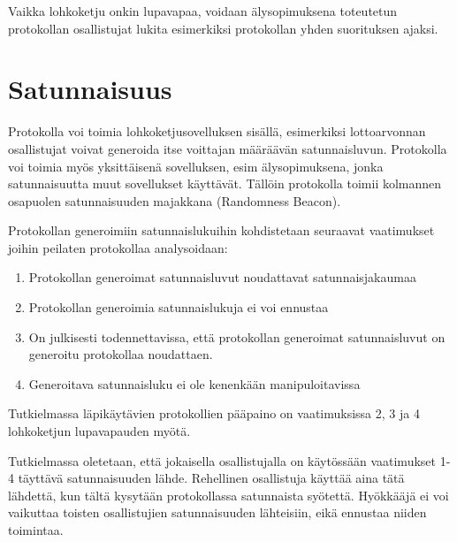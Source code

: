 Vaikka lohkoketju onkin lupavapaa, voidaan älysopimuksena toteutetun protokollan osallistujat lukita esimerkiksi protokollan yhden suorituksen ajaksi.

\section{Satunnaisuus}

Protokolla voi toimia lohkoketjusovelluksen sisällä, esimerkiksi lottoarvonnan osallistujat voivat generoida itse voittajan määräävän satunnaisluvun. Protokolla voi toimia myös yksittäisenä sovelluksen, esim älysopimuksena, jonka satunnaisuutta muut sovellukset käyttävät. Tällöin protokolla toimii kolmannen osapuolen satunnaisuuden majakkana (Randomness Beacon).

Protokollan generoimiin satunnaislukuihin kohdistetaan seuraavat vaatimukset joihin peilaten protokollaa analysoidaan:
\begin{enumerate}
    \item Protokollan generoimat satunnaisluvut noudattavat satunnaisjakaumaa
    \item Protokollan generoimia satunnaislukuja ei voi ennustaa
    \item On julkisesti todennettavissa, että protokollan generoimat satunnaisluvut on generoitu protokollaa noudattaen.
    \item Generoitava satunnaisluku ei ole kenenkään manipuloitavissa
\end{enumerate}

Tutkielmassa läpikäytävien protokollien pääpaino on vaatimuksissa 2, 3 ja 4 lohkoketjun lupavapauden myötä. 

Tutkielmassa oletetaan, että jokaisella osallistujalla on käytössään vaatimukset 1-4 täyttävä satunnaisuuden lähde. Rehellinen osallistuja käyttää aina tätä lähdettä, kun tältä kysytään protokollassa satunnaista syötettä. Hyökkääjä ei voi vaikuttaa toisten osallistujien satunnaisuuden lähteisiin, eikä ennustaa niiden toimintaa.

